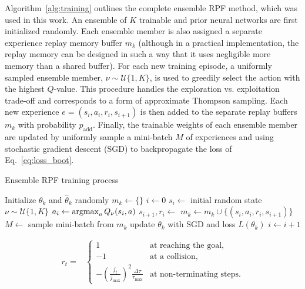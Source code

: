 Algorithm~\ref{alg:training} outlines the complete ensemble RPF method, which was used in this work. An ensemble of $K$ trainable and prior neural networks are first initialized randomly. Each ensemble member is also assigned a separate experience replay memory buffer $m_k$ (although in a practical implementation, the replay memory can be designed in such a way that it uses negligible more memory than a shared buffer). For each new training episode, a uniformly sampled ensemble member, $\nu \sim \mathcal{U}\{1,K\}$, is used to greedily select the action with the highest $Q$-value. This procedure handles the exploration vs. exploitation trade-off and corresponds to a form of approximate Thompson sampling. Each new experience $e = (s_i, a_i, r_i, s_{i+1})$ is then added to the separate replay buffers $m_k$ with probability $p_\mathrm{add}$. Finally, the trainable weights of each ensemble member are updated by uniformly sample a mini-batch $M$ of experiences and using stochastic gradient descent (SGD) to backpropagate the loss of Eq.~\ref{eq:loss_boot}.

\begin{algorithm}[!t]
	\caption{Ensemble RPF training process}\label{alg:training}
	\begin{algorithmic}[1]
			\State Initialize $\theta_k$ and $\hat{\theta}_k$ randomly
			\State $m_k \gets \{\}$
		\EndFor
		\State $i \gets 0$
			\State $s_i \gets $ initial random state
			\State $\nu \sim \mathcal{U}\{1,K\}$%
				\State $a_i \gets \operatorname*{argmax}_{a} Q_\nu(s_i,a)$
				\State $s_{i+1}, r_i \gets $ 
						\State $m_k \gets m_k \cup \{(s_i, a_i, r_i, s_{i+1})\}$
					\EndIf
					\State $M \gets $ sample mini-batch from $m_k$
					\State update $\theta_k$ with SGD and loss $L(\theta_k)$
				\EndFor
				\State $i \gets i + 1$
			\EndWhile
		\EndWhile
	\end{algorithmic}
\end{algorithm}

\begin{align*}
r_t = &\begin{cases}
1 & \text{at reaching the goal, }\\
-1 & \text{at a collision},\\
-\left(\frac{j_t}{j_{\max}}\right)^2\frac{\Delta \tau}{\tau_\mathrm{max}} & \text{at non-terminating steps.}
\end{cases} 
\end{align*}


